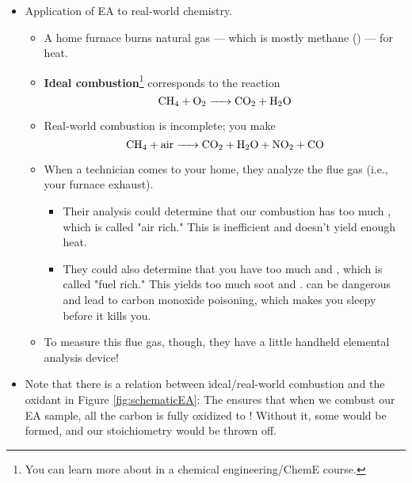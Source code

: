 \documentclass[../notes.tex]{subfiles}
\begin{document}
\begin{itemize}
\begin{itemize}
    \end{itemize}
    \item Application of EA to real-world chemistry.
    \begin{itemize}
        \item A home furnace burns natural gas --- which is mostly methane () --- for heat.
        \item \textbf{Ideal combustion}\footnote{You can learn more about in a chemical engineering/ChemE course.} corresponds to the reaction
        \begin{equation*}
            \ce{CH4 + O2 -> CO2 + H2O}
        \end{equation*}
        \item Real-world combustion is incomplete; you make
        \begin{equation*}
            \ce{CH4 + air -> CO2 + H2O + NO2 + CO}
        \end{equation*}
        \item When a technician comes to your home, they analyze the flue gas (i.e., your furnace exhaust).
        \begin{itemize}
            \item Their analysis could determine that our combustion has too much , which is called "air rich." This is inefficient and doesn't yield enough heat.
            \item They could also determine that you have too much  and , which is called "fuel rich." This yields too much soot and .  can be dangerous and lead to carbon monoxide poisoning, which makes you sleepy before it kills you.
        \end{itemize}
        \item To measure this flue gas, though, they have a little handheld elemental analysis device!
    \end{itemize}
    \item Note that there is a relation between ideal/real-world combustion and the  oxidant in Figure \ref{fig:schematicEA}: The  ensures that when we combust our EA sample, all the carbon is fully oxidized to ! Without it, some  would be formed, and our stoichiometry would be thrown off.
\end{itemize}
\end{document}

